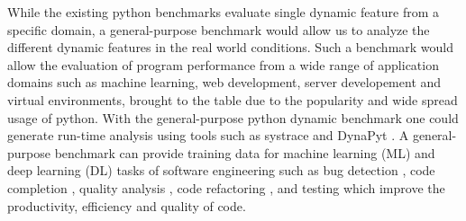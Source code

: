 While the existing python benchmarks evaluate single dynamic feature from a specific domain, a general-purpose benchmark would allow us to analyze the different dynamic features in the real world conditions. Such a benchmark would allow the evaluation of program performance from a wide range of application domains such as machine learning, web development, server developement and virtual environments, brought to the table due to the popularity and wide spread usage of python. With the general-purpose python dynamic benchmark one could generate run-time analysis using tools such as systrace \cite{systrace} and DynaPyt \cite{DynaPyt2022}. A general-purpose benchmark can provide training data for machine learning (ML) and deep learning (DL) tasks of software engineering such as bug detection \cite{DeepBugs2018}, code completion \cite{code_completion}, quality analysis \cite{Code_analysis_1, Code_analysis_2}, code refactoring \cite{code_refactoring}, and testing \cite{testing_1, testing_2, testing_3} which improve the productivity, efficiency and quality of code.

